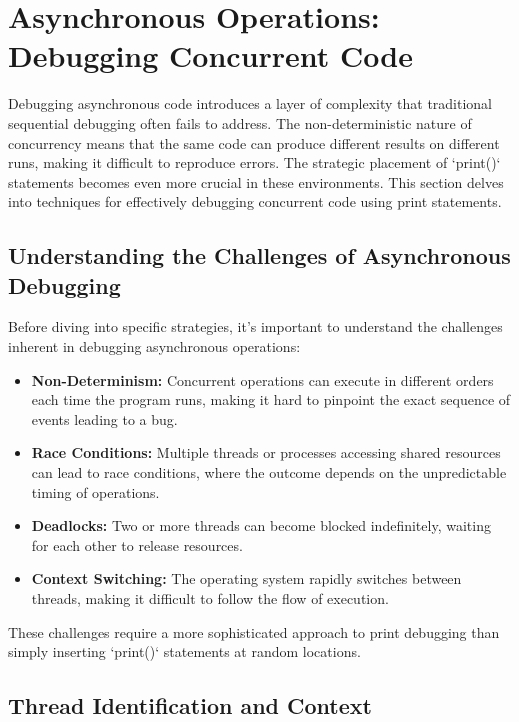 \documentclass{article}
\begin{document}
{{{\section*{Asynchronous Operations: Debugging Concurrent Code}

Debugging asynchronous code introduces a layer of complexity that traditional sequential debugging often fails to address. The non-deterministic nature of concurrency means that the same code can produce different results on different runs, making it difficult to reproduce errors. The strategic placement of `print()` statements becomes even more crucial in these environments. This section delves into techniques for effectively debugging concurrent code using print statements.

\subsection*{Understanding the Challenges of Asynchronous Debugging}

Before diving into specific strategies, it's important to understand the challenges inherent in debugging asynchronous operations:

\begin{itemize}
    \item \textbf{Non-Determinism:} Concurrent operations can execute in different orders each time the program runs, making it hard to pinpoint the exact sequence of events leading to a bug.
    \item \textbf{Race Conditions:} Multiple threads or processes accessing shared resources can lead to race conditions, where the outcome depends on the unpredictable timing of operations.
    \item \textbf{Deadlocks:} Two or more threads can become blocked indefinitely, waiting for each other to release resources.
    \item \textbf{Context Switching:} The operating system rapidly switches between threads, making it difficult to follow the flow of execution.
\end{itemize}

These challenges require a more sophisticated approach to print debugging than simply inserting `print()` statements at random locations.

\subsection*{Thread Identification and Context}

}}}
\end{document}
